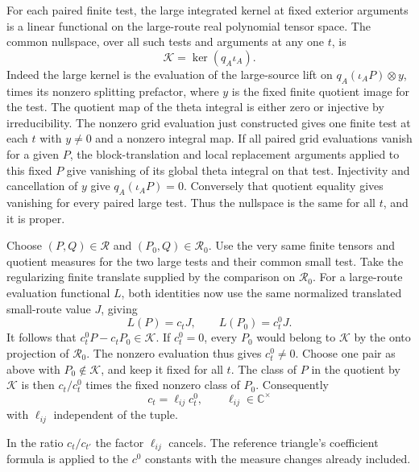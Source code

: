 For each paired finite test, the large integrated
kernel at fixed exterior arguments is a linear
functional on the large-route real polynomial tensor
space. The common nullspace, over all such tests and
arguments at any one \(t\), is
\[
 \mathcal K=\ker(q_A\iota_A).
\]
Indeed the large kernel is the evaluation of the
large-source lift on \(q_A(\iota_A P)\otimes y\),
times its nonzero splitting prefactor, where \(y\)
is the fixed finite quotient image for the test.
The quotient map of the theta integral is either zero
or injective by irreducibility. The nonzero grid
evaluation just constructed gives one finite test at
each \(t\) with \(y\ne0\) and a nonzero integral map.
If all paired grid evaluations vanish for a given
\(P\), the block-translation and local replacement
arguments applied to this fixed \(P\) give vanishing
of its global theta integral on that test. Injectivity
and cancellation of \(y\) give \(q_A(\iota_A P)=0\).
Conversely that quotient equality gives vanishing
for every paired large test.
Thus the nullspace is the same for all \(t\), and it
is proper.

Choose \((P,Q)\in\mathscr R\) and
\((P_0,Q)\in\mathscr R_0\). Use the very same
finite tensors and quotient measures for the two
large tests and their common small test. Take the
regularizing finite translate supplied by the
comparison on \(\mathscr R_0\).
For a large-route evaluation functional \(L\), both
identities now use the same normalized translated
small-route value \(J\), giving
\[
 L(P)=c_tJ,\qquad L(P_0)=c_t^0J.
\]
It follows that \(c_t^0P-c_tP_0\in\mathcal K\).
If \(c_t^0=0\), every \(P_0\) would belong to
\(\mathcal K\) by the onto projection of
\(\mathscr R_0\). The nonzero evaluation thus gives
\(c_t^0\ne0\). Choose one pair as above with
\(P_0\notin\mathcal K\), and keep it fixed for all \(t\).
The class of \(P\) in the quotient by \(\mathcal K\)
is then \(c_t/c_t^0\) times the fixed nonzero class
of \(P_0\). Consequently
\[
 c_t=\ell_{ij}c_t^0,\qquad
 \ell_{ij}\in\mathbb C^\times
\]
with \(\ell_{ij}\) independent of the tuple.

In the ratio \(c_t/c_{t'}\) the factor \(\ell_{ij}\)
cancels. The reference triangle's coefficient formula
is applied to the \(c^0\) constants with the measure
changes already included.

